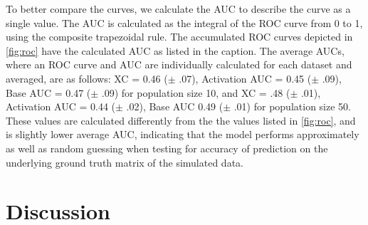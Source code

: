 \documentclass[11pt,titlepage]{article}
\begin{document}
To better compare the curves, we calculate the AUC to describe the curve as a single value. The AUC is calculated as the integral of the ROC curve from 0 to 1, using the composite trapezoidal rule. The accumulated ROC curves depicted in \ref{fig:roc} have the calculated AUC as listed in the caption. The average AUCs, where an ROC curve and AUC are individually calculated for each dataset and averaged, are as follows: XC = 0.46 ($\pm$ .07), Activation AUC = 0.45 ($\pm$ .09), Base AUC = 0.47 ($\pm$ .09) for population size 10, and XC = .48 ($\pm$ .01), Activation AUC = 0.44 ($\pm$ .02), Base AUC 0.49 ($\pm$ .01) for population size 50. These values are calculated differently from the the values listed in \ref{fig:roc}, and is slightly lower average AUC, indicating that the model performs approximately as well as random guessing when testing for accuracy of prediction on the underlying ground truth matrix of the simulated data.

\newpage
\section{Discussion}
\end{document}
